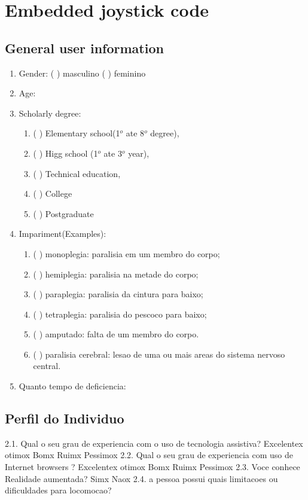 \chapter{Embedded joystick code}
\label{sec:embeddedjoystick}

\section{General user information}

\begin{enumerate}
\item Gender: ( ) masculino ( ) feminino
\item Age: 
\item Scholarly degree:
\begin{enumerate}[label=(\alph*)]
\item (    ) Elementary school(1$^{o}$ ate 8$^{o}$  degree),
\item (    ) Higg school (1$^{o}$  ate 3$^{o}$  year),
\item (    ) Technical education,
\item (    ) College
\item (    ) Postgraduate
\end{enumerate}
\item Impariment(Examples):
\begin{enumerate}[label=(\alph*)]
\item ( ) monoplegia: paralisia em um membro do corpo;
\item ( ) hemiplegia: paralisia na metade do corpo;
\item ( ) paraplegia: paralisia da cintura para baixo;
\item ( ) tetraplegia: paralisia do pescoco para baixo;
\item ( ) amputado: falta de um membro do corpo.
\item ( ) paralisia cerebral: lesao de uma ou mais areas do sistema nervoso central.
\end{enumerate}
\item  Quanto tempo de deficiencia:
\end{enumerate}

\section{Perfil do Individuo}

2.1.	Qual o seu grau de experiencia com o uso de tecnologia assistiva?
Excelentex otimox Bomx Ruimx Pessimox
2.2.	Qual o seu grau de experiencia com uso de Internet browsers ?
Excelentex otimox Bomx Ruimx Pessimox
2.3.	Voce conhece Realidade aumentada?
Simx Naox
2.4.	a pessoa possui quais limitacoes ou dificuldades para locomocao?

